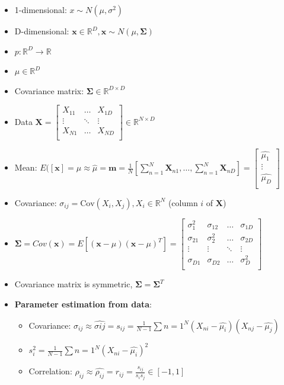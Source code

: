 \documentclass{article}
\begin{document}
\begin{itemize}
    \item 1-dimensional: $x \sim N(\mu, \sigma ^2)$
    \item D-dimensional: $\mathbf{x} \in \mathbb{R}^{D}, \mathbf{x} \sim N(\mu, \mathbf{\Sigma})$
    \item $p: \mathbb{R}^D \rightarrow \mathbb{R}$
    \item $\mu \in \mathbb{R}^D$
    \item Covariance matrix: $\mathbf{\Sigma} \in \mathbb{R}^{D \times D}$
    \item Data $\mathbf{X}=\begin{bmatrix}
X_{11} & \dots & X_{1D} \\
\vdots & \ddots & \vdots \\
X_{N1} & \dots & X_{ND} \\
\end{bmatrix} \in \mathbb{R}^{N \times D}$
    \item Mean: $E([\mathbf{x}]=\mu \approx \hat{\mu} = \mathbf{m} = \frac{1}{N}[\sum_{n=1}^N \mathbf{X}_{n1},\dots,\sum_{n=1}^N \mathbf{X}_{nD}]=
    \begin{bmatrix}
\hat{\mu_1} \\
\vdots \\
\hat{\mu_D} \\
\end{bmatrix} $
    \item Covariance: $\sigma_{ij} = \text{Cov}(X_i,X_j), X_i \in \mathbb{R}^N$ (column $i$ of $\mathbf{X}$)
    \item $\mathbf{\Sigma}=Cov(\mathbf{x})=E[(\mathbf{x}-\mu)(\mathbf{x}-\mu)^T]=\begin{bmatrix}
\sigma_1^2 & \sigma_{12} & \dots & \sigma_{1D} \\
\sigma_{21} & \sigma_2^2 & \dots & \sigma_{2D} \\
\vdots & \vdots & \ddots & \vdots \\
\sigma_{D1} & \sigma_{D2} & \dots & \sigma_D^2 \\
\end{bmatrix}$
    \item Covariance matrix is symmetric, $\mathbf{\Sigma}=\mathbf{\Sigma}^T$
    \item \textbf{Parameter estimation from data}:
    \begin{itemize}
        \item Covariance: $\sigma_{ij} \approx \hat{\sigma{ij}}=s_{ij}=\frac{1}{N-1} \sum{n=1}^N (X_{ni}-\hat{\mu_i})(X_{nj}-\hat{\mu_j})$
        \item $s_i^2=\frac{1}{N-1} \sum{n=1}^N (X_{ni}-\hat{\mu_i})^2$
        \item Correlation: $\rho_{ij} \approx \hat{\rho_{ij}}=r_{ij}=\frac{s_{ij}}{s_i s_j} \in [-1,1]$
    \end{itemize}
\end{itemize}
\end{document}
